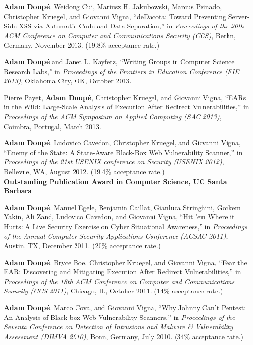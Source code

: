 \documentclass[11pt,letterpaper,sans]{moderncv}
\begin{document}
\begin{etaremune}
\item \textbf{Adam Doup\'e}, Weidong Cui, Mariusz H. Jakubowski,
  Marcus Peinado, Christopher Kruegel, and Giovanni Vigna, ``deDacota:
  Toward Preventing Server-Side XSS via Automatic Code and Data
  Separation,'' in \emph{Proceedings of the 20th ACM Conference on
    Computer and Communications Security (CCS)}, Berlin, Germany,
  November 2013. (19.8\% acceptance rate.)

\item \textbf{Adam Doup\'e} and Janet L. Kayfetz, ``Writing Groups in
  Computer Science Research Labs,'' in \emph{Proceedings of the
    Frontiers in Education Conference (FIE 2013)}, Oklahoma City, OK,
  October 2013.

\item \underline{Pierre Payet}, \textbf{Adam Doup\'e}, Christopher
  Kruegel, and Giovanni Vigna, ``EARs in the Wild: Large-Scale
  Analysis of Execution After Redirect Vulnerabilities,'' in
  \emph{Proceedings of the ACM Symposium on Applied Computing (SAC
    2013)}, Coimbra, Portugal, March 2013.

\item \textbf{Adam Doup\'e}, Ludovico Cavedon, Christopher Kruegel,
  and Giovanni Vigna, ``Enemy of the State: A State-Aware Black-Box
  Web Vulnerability Scanner,'' in \emph{Proceedings of the 21st USENIX
    conference on Security (USENIX 2012)}, Bellevue, WA, August 2012.
  (19.4\% acceptance rate.) \\
  \textbf{Outstanding Publication Award in Computer
  Science, UC Santa Barbara}

\item \textbf{Adam Doup\'e}, Manuel Egele, Benjamin Caillat, Gianluca
  Stringhini, Gorkem Yakin, Ali Zand, Ludovico Cavedon, and Giovanni
  Vigna, ``Hit 'em Where it Hurts: A Live Security Exercise on Cyber
  Situational Awareness,'' in \emph{Proceedings of the Annual Computer
    Security Applications Conference (ACSAC 2011)}, Austin, TX,
  December 2011. (20\% acceptance rate.)

\item \textbf{Adam Doup\'e}, Bryce Boe, Christopher Kruegel, and
  Giovanni Vigna, ``Fear the EAR: Discovering and Mitigating Execution
  After Redirect Vulnerabilities,'' in \emph{Proceedings of the 18th
    ACM Conference on Computer and Communications Security (CCS
    2011)}, Chicago, IL, October 2011. (14\% acceptance rate.)

\item \textbf{Adam Doup\'e}, Marco Cova, and Giovanni Vigna, ``Why
  Johnny Can't Pentest: An Analysis of Black-box Web Vulnerability
  Scanners,'' in \emph{Proceedings of the Seventh Conference on
    Detection of Intrusions and Malware \& Vulnerability Assessment
    (DIMVA 2010)}, Bonn, Germany, July 2010. (34\% acceptance rate.)
  
\end{etaremune}
\end{document}
